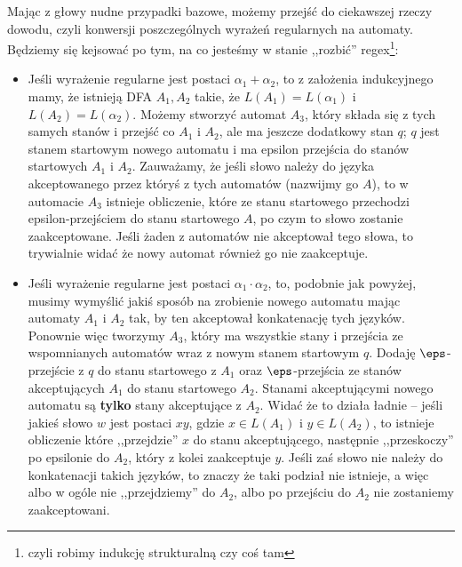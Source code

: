     Mając z głowy nudne przypadki bazowe, możemy przejść do ciekawszej rzeczy dowodu, czyli konwersji poszczególnych wyrażeń regularnych na automaty. Będziemy się kejsować po tym, na co jesteśmy w stanie ,,rozbić'' regex\footnote{czyli robimy indukcję strukturalną czy coś tam}: 
    \begin{itemize}
        \item Jeśli wyrażenie regularne jest postaci \( \alpha_1 + \alpha_2 \), to z założenia indukcyjnego mamy, że istnieją DFA \(A_1, A_2\) takie, że \(L(A_1) = L(\alpha_1)\) i \(L(A_2) = L(\alpha_2)\). Możemy stworzyć automat \(A_3\), który składa się z tych samych stanów i przejść co \(A_1\) i \(A_2\), ale ma jeszcze dodatkowy stan \(q\); \(q\) jest stanem startowym nowego automatu i ma epsilon przejścia do stanów startowych \(A_1\) i \(A_2\).  Zauważamy, że jeśli słowo należy do języka akceptowanego przez któryś z tych automatów (nazwijmy go \(A\)), to w automacie \(A_3\) istnieje obliczenie, które ze stanu startowego przechodzi epsilon-przejściem do stanu startowego \(A\), po czym to słowo zostanie zaakceptowane. Jeśli żaden z automatów nie akceptował tego słowa, to trywialnie widać że nowy automat również go nie zaakceptuje.
        \item Jeśli wyrażenie regularne jest postaci \( \alpha_1 \cdot \alpha_2 \), to, podobnie jak powyżej, musimy wymyślić jakiś sposób na zrobienie nowego automatu mając automaty \(A_1\) i \(A_2\) tak, by ten akceptował konkatenację tych języków. Ponownie więc tworzymy \(A_3\), który ma wszystkie stany i przejścia ze wspomnianych automatów wraz z nowym stanem startowym \(q\). Dodaję \(\eps\)-przejście z \(q\) do stanu startowego z \(A_1\) oraz \(\eps\)-przejścia ze stanów akceptujących \(A_1\) do stanu startowego \(A_2\). Stanami akceptującymi nowego automatu są \textbf{tylko} stany akceptujące z \(A_2\). Widać że to działa ładnie -- jeśli jakieś słowo \(w\) jest postaci \(xy\), gdzie \(x\in L(A_1)\) i \(y \in L(A_2)\), to istnieje obliczenie które ,,przejdzie'' \(x\) do stanu akceptującego, następnie ,,przeskoczy'' po epsilonie do \(A_2\), który z kolei zaakceptuje \(y\). Jeśli zaś słowo nie należy do konkatenacji takich języków, to znaczy że taki podział nie istnieje, a więc albo w ogóle nie ,,przejdziemy'' do \(A_2\), albo po przejściu do \(A_2\) nie zostaniemy zaakceptowani. 

\end{itemize}
